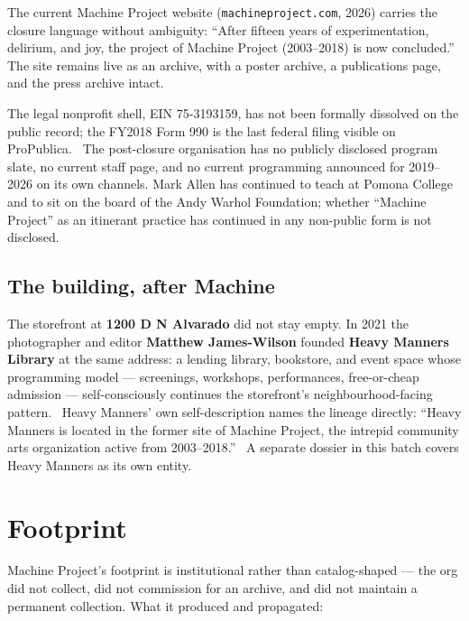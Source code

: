 \documentclass[10pt,letterpaper,twocolumn]{article}
\begin{document}
The current Machine Project website (\texttt{machineproject.com}, 2026) carries the closure language without ambiguity: ``After fifteen years of experimentation, delirium, and joy, the project of Machine Project (2003--2018) is now concluded.''~\citep{machineproject} The site remains live as an archive, with a poster archive, a publications page, and the press archive intact.

The legal nonprofit shell, EIN 75-3193159, has not been formally dissolved on the public record; the FY2018 Form 990 is the last federal filing visible on ProPublica.~\citep{propublicamachine} The post-closure organisation has no publicly disclosed program slate, no current staff page, and no current programming announced for 2019--2026 on its own channels. Mark Allen has continued to teach at Pomona College and to sit on the board of the Andy Warhol Foundation; whether ``Machine Project'' as an itinerant practice has continued in any non-public form is not disclosed.

\subsection{The building, after Machine}

The storefront at \textbf{1200 D N Alvarado} did not stay empty. In 2021 the photographer and editor \textbf{Matthew James-Wilson} founded \textbf{Heavy Manners Library} at the same address: a lending library, bookstore, and event space whose programming model --- screenings, workshops, performances, free-or-cheap admission --- self-consciously continues the storefront's neighbourhood-facing pattern.~\citep{heavymanners} Heavy Manners' own self-description names the lineage directly: ``Heavy Manners is located in the former site of Machine Project, the intrepid community arts organization active from 2003--2018.''~\citep{heavymanners} A separate dossier in this batch covers Heavy Manners as its own entity.

\section{Footprint}

Machine Project's footprint is institutional rather than catalog-shaped --- the org did not collect, did not commission for an archive, and did not maintain a permanent collection. What it produced and propagated:
\end{document}
